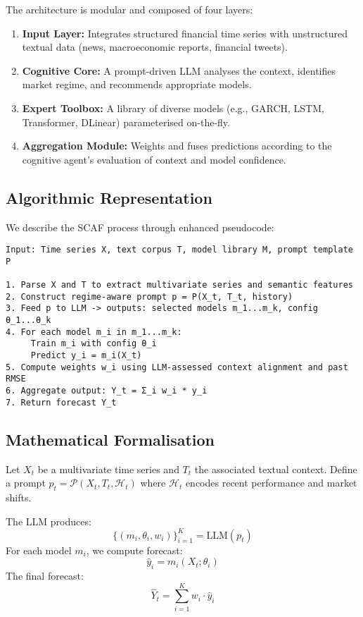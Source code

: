 \documentclass[conference]{IEEEtran}
\begin{document}
The architecture is modular and composed of four layers:
\begin{enumerate}
    \item \textbf{Input Layer:} Integrates structured financial time series with unstructured textual data (news, macroeconomic reports, financial tweets).
    \item \textbf{Cognitive Core:} A prompt-driven LLM analyses the context, identifies market regime, and recommends appropriate models.
    \item \textbf{Expert Toolbox:} A library of diverse models (e.g., GARCH, LSTM, Transformer, DLinear) parameterised on-the-fly.
    \item \textbf{Aggregation Module:} Weights and fuses predictions according to the cognitive agent’s evaluation of context and model confidence.
\end{enumerate}

\subsection{Algorithmic Representation}
We describe the SCAF process through enhanced pseudocode:

\begin{verbatim}
Input: Time series X, text corpus T, model library M, prompt template P

1. Parse X and T to extract multivariate series and semantic features
2. Construct regime-aware prompt p = P(X_t, T_t, history)
3. Feed p to LLM -> outputs: selected models m_1...m_k, config θ_1...θ_k
4. For each model m_i in m_1...m_k:
     Train m_i with config θ_i
     Predict y_i = m_i(X_t)
5. Compute weights w_i using LLM-assessed context alignment and past RMSE
6. Aggregate output: Y_t = Σ_i w_i * y_i
7. Return forecast Y_t
\end{verbatim}

\subsection{Mathematical Formalisation}
Let $X_t$ be a multivariate time series and $T_t$ the associated textual context. Define a prompt $p_t = \mathcal{P}(X_t, T_t, \mathcal{H}_t)$ where $\mathcal{H}_t$ encodes recent performance and market shifts.

The LLM produces:
\[
\{(m_i, \theta_i, w_i)\}_{i=1}^K = \text{LLM}(p_t)
\]
For each model $m_i$, we compute forecast:
\[
\hat{y}_i = m_i(X_t; \theta_i)
\]
The final forecast:
\[
\hat{Y}_t = \sum_{i=1}^K w_i \cdot \hat{y}_i
\]
\end{document}
